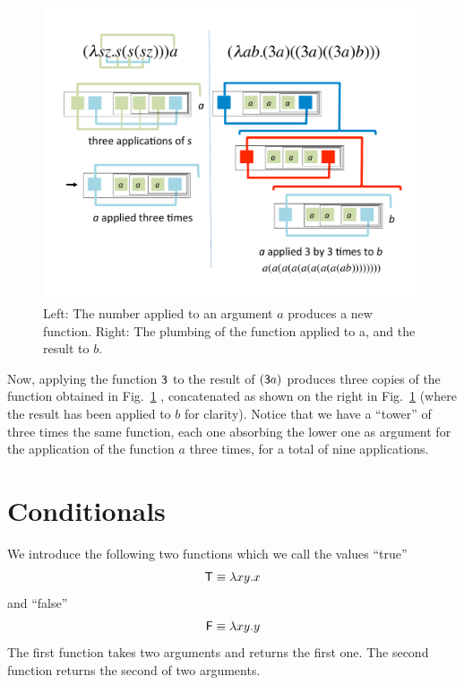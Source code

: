 \documentclass[12pt]{article}
\begin{document}
\begin{figure}[htb]
\centerline{\includegraphics[width=13cm]{lamone}}
\caption{Left: The number {} applied to an argument $a$ produces a new function. Right: The plumbing of the function {} applied to {}a, 
and the result to $b$.\label{mult1}}
\end{figure} 





Now, applying the function ${\sf 3}$ to the result of $({\sf 3}a)$ produces three copies of the function obtained in Fig.~\ref{mult1} , concatenated as shown on the right in Fig.~\ref{mult1} (where the result has been applied to $b$  for clarity). Notice that we have a ``tower'' of three times the same function, each one absorbing the lower one as argument for the application of the function $a$ three times, for a total of nine applications.




\section{Conditionals}
We introduce the following two functions which we call the values ``true''
$${\sf T}\equiv \lambda xy.x$$ and ``false''
$${\sf F}\equiv \lambda xy.y$$
The first function takes two arguments and returns the first one. The second function returns the second of two arguments.
\end{document}
